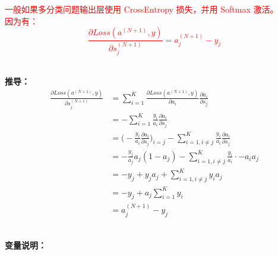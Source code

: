 \noindent \textcolor{red}{一般如果多分类问题输出层使用 CrossEntropy 损失，并用 Softmax 激活。\\因为有：\\$$\frac{\partial Loss(a^{(N+1)}, y)}{\partial s^{(N+1)}_j} = a^{(N+1)}_j -y_j$$
}

~\\
\noindent\textbf{推导：}
\begin{align*}
  \frac{\partial Loss(a^{(N+1)}, y)}{\partial s^{(N+1)}_j} & = \sum_{i=1}^{K} \frac{\partial Loss(a^{(N+1)}, y)}{\partial a_i}\frac{\partial a_i}{\partial s_j}\\
  & = -\sum_{i=1}^{K}\frac{y_i}{a_i}\frac{\partial a_i}{\partial s_j}\\
  &= \big(-\frac{y_i}{a_i}\frac{\partial a_i}{\partial s_j}\big)_{i=j}-\sum_{i=1,i\neq j}^{K}\frac{y_i}{a_i}\frac{\partial a_i}{\partial s_j}\\
  &= -\frac{y_j}{a_j}a_j(1-a_j)-\sum_{i=1,i\neq j}^{K}\frac{y_i}{a_i}\cdot -a_ia_j\\
  &=-y_j+y_ja_j+\sum_{i=1,i\neq j}^{K}y_ia_j\\
  & = -y_j+a_j\sum_{i=1}^{K}y_i\\
  & = a^{(N+1)}_j-y_j
\end{align*}

~\\
\noindent \textbf{变量说明：}


